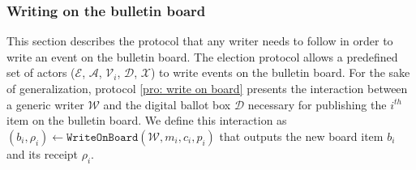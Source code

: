 \subsubsection{Writing on the bulletin board} \label{sec: writing on the bulletin board}
This section describes the protocol that any writer needs to follow in order to write an event on the bulletin board. The election protocol allows a predefined set of actors ($\mathcal{E}$, $\mathcal{A}$, $\mathcal{V}_i$, $\mathcal{D}$, $\mathcal{X}$) to write events on the bulletin board. For the sake of generalization, protocol \ref{pro: write on board} presents the interaction between a generic writer $\mathcal{W}$ and the digital ballot box $\mathcal{D}$ necessary for publishing the $i^{th}$ item on the bulletin board. We define this interaction as $(b_i, \rho_i) \gets \mathtt{WriteOnBoard}(\mathcal{W}, m_i, c_i, p_i)$ that outputs the new board item $b_i$ and its receipt $\rho_i$.

